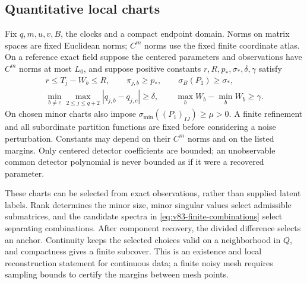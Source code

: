 \subsection{Quantitative local charts}
Fix $q,m,u,v,B$, the clocks and a compact endpoint domain. Norms on
matrix spaces are fixed Euclidean norms; $C^m$ norms use the fixed
finite coordinate atlas. On a reference exact field suppose the
centered parameters and observations have $C^m$ norms at most $L_0$,
and suppose positive constants $r,R,p_*,\sigma_*,\delta,\gamma$
satisfy
\begin{gather}
 r\le T_j-W_b\le R,\qquad \pi_{j,b}\ge p_*,\qquad
               \sigma_B(P_1)\ge\sigma_*,\label{eq:v83-margins}\\
 \min_{b\ne c}\max_{2\le j\le q+2}|q_{j,b}-q_{j,c}|\ge\delta,
 \qquad \max_b W_b-\min_b W_b\ge\gamma.\nonumber
\end{gather}
On chosen minor charts also impose
$\sigma_{\min}((P_1)_{IJ})\ge\mu>0$. A finite refinement and all
subordinate partition functions are fixed before considering a noise
perturbation. Constants may depend on their $C^m$ norms and on the
listed margins. Only centered detector coefficients are bounded; an
unobservable common detector polynomial is never bounded as if it
were a recovered parameter.

These charts can be selected from exact observations, rather than
supplied latent labels. Rank determines the minor size, minor singular
values select admissible submatrices, and the candidate spectra in
\eqref{eq:v83-finite-combinations} select separating combinations.
After component recovery, the divided difference selects an anchor.
Continuity keeps the selected choices valid on a neighborhood in $Q$,
and compactness gives a finite subcover. This is an existence and
local reconstruction statement for continuous data; a finite noisy
mesh requires sampling bounds to certify the margins between mesh
points.

